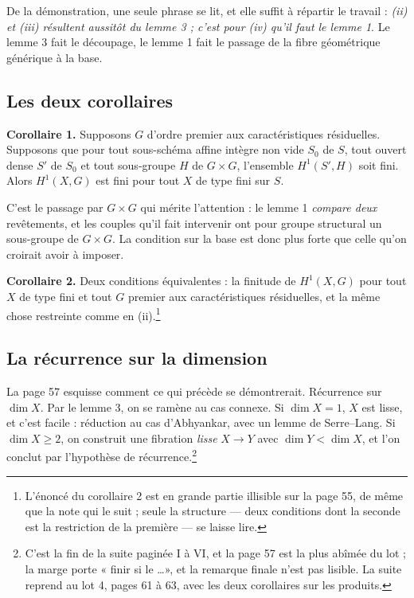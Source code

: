 \documentclass[11pt,a4paper]{article}
\begin{document}
De la démonstration, une seule phrase se lit, et elle suffit à répartir le
travail : \emph{(ii) et (iii) résultent aussitôt du lemme 3 ; c'est pour (iv)
qu'il faut le lemme 1}. Le lemme 3 fait le découpage, le lemme 1 fait le
passage de la fibre géométrique générique à la base.

\subsection*{Les deux corollaires}

\textbf{Corollaire 1.} Supposons $G$ d'ordre premier aux caractéristiques
résiduelles. Supposons que pour tout sous-schéma affine intègre non vide
$S_{0}$ de $S$, tout ouvert dense $S'$ de $S_{0}$ et tout sous-groupe $H$ de
$G \times G$, l'ensemble $H^{1}(S', H)$ soit fini. Alors $H^{1}(X, G)$ est fini
pour tout $X$ de type fini sur $S$.

C'est le passage par $G \times G$ qui mérite l'attention : le lemme 1
\emph{compare deux} revêtements, et les couples qu'il fait intervenir ont pour
groupe structural un sous-groupe de $G \times G$. La condition sur la base est
donc plus forte que celle qu'on croirait avoir à imposer.

\textbf{Corollaire 2.} Deux conditions équivalentes : la finitude de
$H^{1}(X, G)$ pour tout $X$ de type fini et tout $G$ premier aux
caractéristiques résiduelles, et la même chose restreinte comme en
(ii).\footnote{L'énoncé du corollaire 2 est en grande partie illisible sur la
page 55, de même que la note qui le suit ; seule la structure --- deux
conditions dont la seconde est la restriction de la première --- se laisse
lire.}

\subsection*{La récurrence sur la dimension}

La page 57 esquisse comment ce qui précède se démontrerait. Récurrence sur
$\dim X$. Par le lemme 3, on se ramène au cas connexe. Si $\dim X = 1$, $X$ est
lisse, et c'est facile : réduction au cas d'Abhyankar, avec un lemme de
Serre--Lang. Si $\dim X \geqslant 2$, on construit une fibration \emph{lisse}
$X \to Y$ avec $\dim Y < \dim X$, et l'on conclut par l'hypothèse de
récurrence.\footnote{C'est la fin de la suite paginée I à VI, et la page 57 est
la plus abîmée du lot ; la marge porte « finir si le \dots », et la remarque
finale n'est pas lisible. La suite reprend au lot 4, pages 61 à 63, avec les
deux corollaires sur les produits.}
\end{document}
